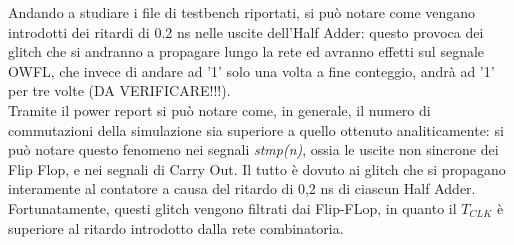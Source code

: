 Andando a studiare i file di testbench riportati, si può notare come vengano introdotti dei ritardi di 0.2 ns nelle uscite dell'Half Adder: questo provoca dei glitch che si andranno a propagare lungo la rete ed avranno effetti sul segnale OWFL, che invece di andare ad '1' solo una volta a fine conteggio, andrà ad '1' per tre volte (DA VERIFICARE!!!).\\
Tramite il power report si può notare come, in generale, il numero di commutazioni della simulazione sia superiore a quello ottenuto analiticamente: si può notare questo fenomeno nei segnali \textit{stmp(n)}, ossia le uscite non sincrone dei Flip Flop, e nei segnali di Carry Out. Il tutto è dovuto ai glitch che si propagano interamente al contatore a causa del ritardo di 0,2 ns di ciascun Half Adder. \\
Fortunatamente, questi glitch vengono filtrati dai Flip-FLop, in quanto il $T_{CLK}$ è superiore al ritardo introdotto dalla rete combinatoria.
